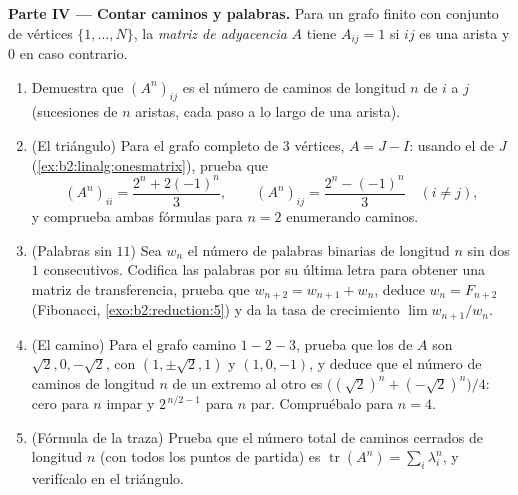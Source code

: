 \begin{problem}
\medskip
\noindent\textbf{Parte IV --- Contar caminos y palabras.} Para un
grafo finito con conjunto de vértices $\{1, \dots, N\}$, la
\emph{matriz de adyacencia} $A$ tiene $A_{ij} = 1$ si $ij$ es una
arista y $0$ en caso contrario.
\begin{enumerate}[resume]
  \item Demuestra que $(A^n)_{ij}$ es el número de caminos de
        longitud $n$ de $i$ a $j$ (sucesiones de $n$ aristas, cada
        paso a lo largo de una arista).
  \item (El triángulo) Para el grafo completo de $3$ vértices, $A =
        J - I$: usando el  de $J$
        (\cref{ex:b2:linalg:onesmatrix}), prueba que
        \[
        (A^n)_{ii} = \frac{2^n + 2(-1)^n}{3},
        \qquad
        (A^n)_{ij} = \frac{2^n - (-1)^n}{3} \quad (i \neq j),
        \]
        y comprueba ambas fórmulas para $n = 2$ enumerando caminos.
  \item (Palabras sin $11$) Sea $w_n$ el número de palabras
        binarias de longitud $n$ sin dos $1$ consecutivos.
        Codifica las palabras por su última letra para obtener una
        matriz de transferencia, prueba que $w_{n+2} = w_{n+1} +
        w_n$, deduce $w_n = F_{n+2}$ (Fibonacci,
        \cref{exo:b2:reduction:5}) y da la tasa de crecimiento
        $\lim w_{n+1}/w_n$.
  \item (El camino) Para el grafo camino $1 - 2 - 3$, prueba que
        los  de $A$ son $\sqrt2, 0, -\sqrt2$, con
         $(1, \pm\sqrt2, 1)$ y $(1, 0, -1)$, y
        deduce que el número de caminos de longitud $n$ de un
        extremo al otro es $\bigl((\sqrt2)^n +
        (-\sqrt2)^n\bigr)/4$: cero para $n$ impar y $2^{\,n/2 - 1}$
        para $n$ par. Compruébalo para $n = 4$.
  \item (Fórmula de la traza) Prueba que el número total de caminos
        cerrados de longitud $n$ (con todos los puntos de partida)
        es $\operatorname{tr}(A^n) = \sum_i \lambda_i^n$, y
        verifícalo en el triángulo.
\end{enumerate}


\end{problem}
